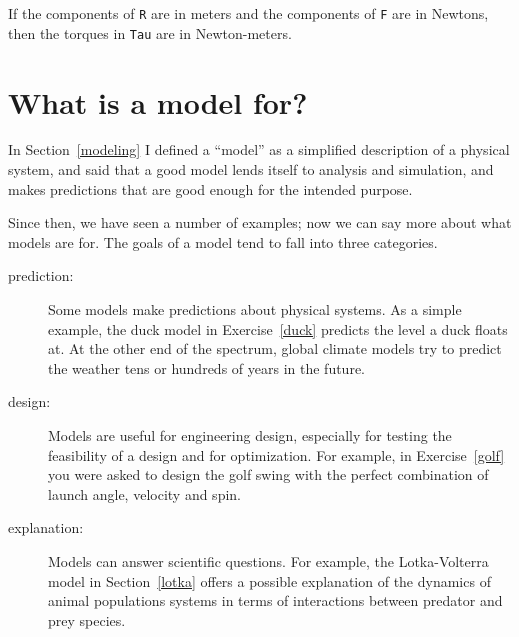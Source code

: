 \documentclass{book}
\begin{document}
If the components of {\tt R} are in meters and the components
of {\tt F} are in Newtons, then the torques in {\tt Tau} are
in Newton-meters.




\section{What is a model for?}

In Section~\ref{modeling} I defined a ``model'' as a simplified
description of a physical system, and said that a good model
lends itself to analysis and simulation, and makes predictions
that are good enough for the intended purpose.

Since then, we have seen a number of examples; now we can
say more about what models are for.  The goals of a model tend
to fall into three categories.
 
\begin{description}

\item[prediction:] Some models make predictions about physical
systems.  As a simple example, the duck model in
Exercise~\ref{duck} predicts the level a duck floats at.  At the other
end of the spectrum, global climate models try to predict the weather
tens or hundreds of years in the future.

\item[design:] Models are useful for engineering design, especially
for testing the feasibility of a design and for optimization.  For
example, in Exercise~\ref{golf} you were asked to design the golf
swing with the perfect combination of launch angle, velocity and spin.

\item[explanation:] Models can answer scientific questions.  For
example, the Lotka-Volterra model in Section~\ref{lotka} offers a
possible explanation of the dynamics of animal populations systems in
terms of interactions between predator and prey species.  

\end{description}
\end{document}
